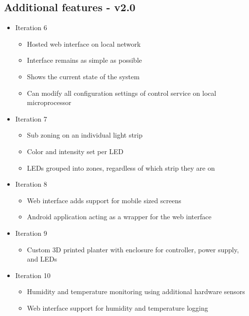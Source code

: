 \documentclass[onecolumn, draftclsnofoot,10pt, compsoc]{IEEEtran}
\begin{document}
		\subsection*{Additional features - v2.0}
			\begin{itemize}
				\item Iteration 6
					\begin{itemize}
						\item Hosted web interface on local network
						\item Interface remains as simple as possible
						\item Shows the current state of the system
						\item Can modify all configuration settings of control service on local microprocessor
					\end{itemize}
				\item Iteration 7
					\begin{itemize}
						\item Sub zoning on an individual light strip
						\item Color and intensity set per LED
						\item LEDs grouped into zones, regardless of which strip they are on
					\end{itemize}
				\item Iteration 8
					\begin{itemize}
						\item Web interface adds support for mobile sized screens
						\item Android application acting as a wrapper for the web interface
					\end{itemize}
				\item Iteration 9
					\begin{itemize}
						\item Custom 3D printed planter with enclosure for controller, power supply, and LEDs
					\end{itemize}
				\item Iteration 10
					\begin{itemize}
						\item Humidity and temperature monitoring using additional hardware sensors
						\item Web interface support for humidity and temperature logging
					\end{itemize}
			\end{itemize}
\end{document}
